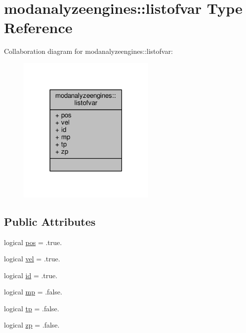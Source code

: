 \hypertarget{structmodanalyzeengines_1_1listofvar}{}\section{modanalyzeengines\+:\+:listofvar Type Reference}
\label{structmodanalyzeengines_1_1listofvar}


Collaboration diagram for modanalyzeengines\+:\+:listofvar\+:\nopagebreak
\begin{figure}[H]
\begin{center}
\leavevmode
\includegraphics[width=189pt]{structmodanalyzeengines_1_1listofvar__coll__graph}
\end{center}
\end{figure}
\subsection*{Public Attributes}
\begin{DoxyCompactItemize}
\item 
logical \hyperlink{structmodanalyzeengines_1_1listofvar_a56fa237dca88fe3d71d4cf27ac53026c}{pos} = .true.
\item 
logical \hyperlink{structmodanalyzeengines_1_1listofvar_acaf2325a18057a558ecc040799333e38}{vel} = .true.
\item 
logical \hyperlink{structmodanalyzeengines_1_1listofvar_a2804cb221c94cd32057d1f5552781a85}{id} = .true.
\item 
logical \hyperlink{structmodanalyzeengines_1_1listofvar_a62147398645606799b7c50fb43da1cf2}{mp} = .false.
\item 
logical \hyperlink{structmodanalyzeengines_1_1listofvar_a104540030e3f4d3e94baa7bb7fb646bb}{tp} = .false.
\item 
logical \hyperlink{structmodanalyzeengines_1_1listofvar_ae456c347d77781a9ea6efcfe2887f710}{zp} = .false.
\end{DoxyCompactItemize}


